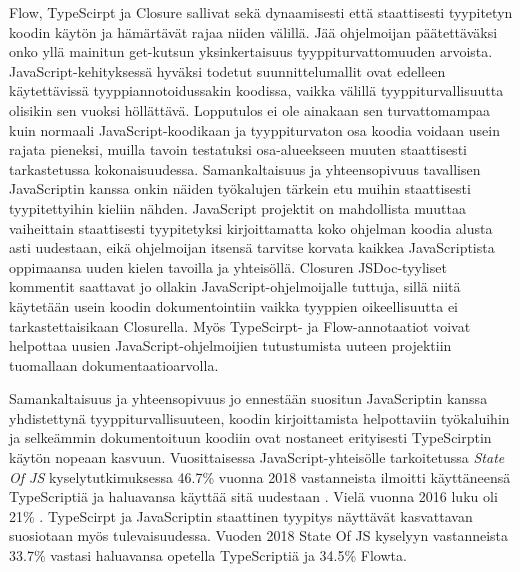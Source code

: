 Flow, TypeScirpt ja Closure sallivat sekä dynaamisesti että
staattisesti tyypitetyn koodin käytön ja hämärtävät rajaa niiden välillä.
Jää ohjelmoijan päätettäväksi onko yllä mainitun get-kutsun yksinkertaisuus
tyyppiturvattomuuden arvoista. JavaScript-kehityksessä hyväksi todetut
suunnittelumallit ovat edelleen käytettävissä tyyppiannotoidussakin
koodissa, vaikka välillä tyyppiturvallisuutta olisikin sen vuoksi höllättävä.
Lopputulos ei ole ainakaan sen turvattomampaa kuin normaali JavaScript-koodikaan
ja tyyppiturvaton osa koodia voidaan usein rajata pieneksi, muilla tavoin
testatuksi osa-alueekseen muuten staattisesti tarkastetussa kokonaisuudessa.
Samankaltaisuus ja yhteensopivuus tavallisen JavaScriptin kanssa onkin
näiden työkalujen tärkein etu muihin staattisesti tyypitettyihin kieliin
nähden. JavaScript projektit on mahdollista muuttaa vaiheittain staattisesti
tyypitetyksi kirjoittamatta koko ohjelman koodia alusta asti uudestaan, eikä
ohjelmoijan itsensä tarvitse korvata kaikkea JavaScriptista oppimaansa
uuden kielen tavoilla ja yhteisöllä. Closuren JSDoc-tyyliset kommentit
saattavat jo ollakin JavaScript-ohjelmoijalle tuttuja, sillä niitä käytetään
usein koodin dokumentointiin vaikka tyyppien oikeellisuutta ei
tarkastettaisikaan Closurella. Myös TypeScirpt- ja Flow-annotaatiot voivat
helpottaa uusien JavaScript-ohjelmoijien tutustumista uuteen projektiin
tuomallaan dokumentaatioarvolla.

Samankaltaisuus ja yhteensopivuus jo ennestään suositun JavaScriptin kanssa
yhdistettynä tyyppiturvallisuuteen, koodin kirjoittamista helpottaviin
työkaluihin ja selkeämmin dokumentoituun koodiin ovat nostaneet erityisesti
TypeScirptin käytön nopeaan kasvuun. Vuosittaisessa JavaScript-yhteisölle
tarkoitetussa \textit{State Of JS} kyselytutkimuksessa 46.7\% vuonna 2018
vastanneista ilmoitti käyttäneensä TypeScriptiä ja haluavansa
käyttää sitä uudestaan \cite{StateOfJs2018}.
Vielä vuonna 2016 luku oli 21\% \cite{StateOfJs2016}. TypeScirpt ja
JavaScriptin staattinen tyypitys näyttävät kasvattavan suosiotaan myös
tulevaisuudessa. Vuoden 2018 State Of JS kyselyyn vastanneista 33.7\%
vastasi haluavansa\newline
opetella TypeScriptiä ja 34.5\% Flowta.
